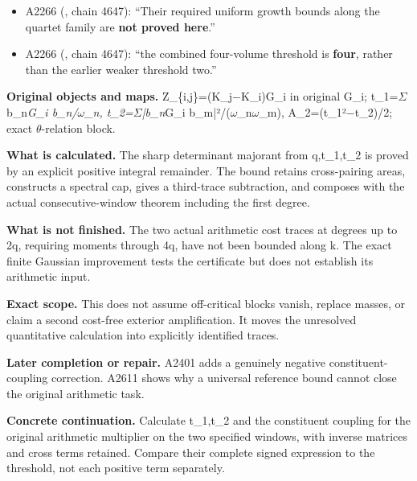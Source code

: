 \begin{itemize}
\tightlist
\item
  A2266 (\protect{}, chain
  4647): ``Their required uniform growth bounds along the quartet family
  are \textbf{not proved here}.''
\item
  A2266 (\protect{}, chain
  4647): ``the combined four-volume threshold is \textbf{four}, rather
  than the earlier weaker threshold two.''
\end{itemize}

\textbf{Original objects and maps.}
Z\_\{i,j\}=(K\_j\allowbreak{}\ensuremath{−}\allowbreak{}K\_i)G\_i in
original G\_i; t\_1=\allowbreak{}\ensuremath{Σ}\allowbreak{}
b\_n\emph{G\_i b\_n/\allowbreak{}\ensuremath{ω}\allowbreak{}\_n,
t\_2=\allowbreak{}\ensuremath{Σ}\allowbreak{}|b\_n}G\_i
b\_m|²/(\allowbreak{}\ensuremath{ω}\allowbreak{}\_n\allowbreak{}\ensuremath{ω}\allowbreak{}\_m),
A\_2=(t\_1²\allowbreak{}\ensuremath{−}\allowbreak{}t\_2)/2; exact
\allowbreak{}\ensuremath{θ}\allowbreak{}-relation block.

\textbf{What is calculated.} The sharp determinant majorant from
q,t\_1,t\_2 is proved by an explicit positive integral remainder. The
bound retains cross-pairing areas, constructs a spectral cap, gives a
third-trace subtraction, and composes with the actual consecutive-window
theorem including the first degree.

\textbf{What is not finished.} The two actual arithmetic cost traces at
degrees up to 2q, requiring moments through 4q, have not been bounded
along k. The exact finite Gaussian improvement tests the certificate but
does not establish its arithmetic input.

\textbf{Exact scope.} This does not assume off-critical blocks vanish,
replace masses, or claim a second cost-free exterior amplification. It
moves the unresolved quantitative calculation into explicitly identified
traces.

\textbf{Later completion or repair.} A2401 adds a genuinely negative
constituent-coupling correction. A2611 shows why a universal reference
bound cannot close the original arithmetic task.

\textbf{Concrete continuation.} Calculate t\_1,t\_2 and the constituent
coupling for the original arithmetic multiplier on the two specified
windows, with inverse matrices and cross terms retained. Compare their
complete signed expression to the threshold, not each positive term
separately.

